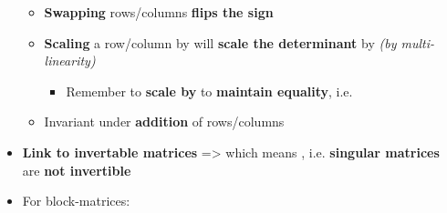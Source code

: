 \begin{itemize}
            \begin{itemize}

                  \item
                        \textbf{Swapping} rows/columns \textbf{flips the sign}
                  \item
                        \textbf{Scaling} a row/column by  will
                        \textbf{scale the determinant} by \iMbox{\lambda} \emph{(by
                              multi-linearity)}

                        \begin{itemize}

                              \item
                                    Remember to \textbf{scale by } to
                                    \textbf{maintain equality},
                                    i.e. 
                        \end{itemize}
                  \item
                        Invariant under \textbf{addition} of rows/columns
            \end{itemize}
      \item
            \textbf{Link to invertable matrices} =>
             which means
            , i.e. \textbf{singular matrices} are
            \textbf{not invertible}
      \item
            For block-matrices:

            \begin{itemize}


\end{itemize}
\end{itemize}
